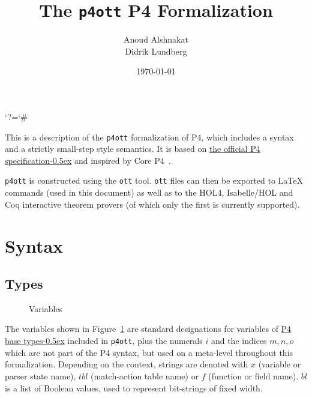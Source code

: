 \documentclass[UTF8]{article}
\title{%
The \texttt{p4ott} P4 Formalization}
\author{Anoud Alshnakat\\
Didrik Lundberg
}
\date{\today}
\begin{document}
\maketitle

\newcommand{\pfott}{\texttt{p4ott}}

\begingroup\lccode`?=`# \lowercase{\endgroup
\newcommand{\specsec}[1]{%
    ?#1%
}
}
\newcommand{\pfourspec}[2]{%
\href{https://p4lang.github.io/p4-spec/docs/P4-16-v1.2.2.html\specsec{#1}}{#2\kern-0.5ex} %
}

\noindent
This is a description of the \pfott{} formalization of P4, which includes a syntax and a strictly small-step style semantics. It is based on \pfourspec{}{the official P4 specification} and inspired by Core P4~\cite{doenges2021petr4}.

\pfott{} is constructed using the \texttt{ott} tool. \texttt{ott} files can then be exported to \LaTeX{} commands (used in this document) as well as to the HOL4, Isabelle/HOL and Coq interactive theorem provers (of which only the first is currently supported).

\section{Syntax}
\subsection{Types}
\newcommand{\num}{\ensuremath{i}}
\newcommand{\vn}{\ensuremath{x}}
\newcommand{\msg}{\ensuremath{\mathit{msg}}}
\newcommand{\tn}{\ensuremath{\mathit{tbl}}}
\newcommand{\fn}{\ensuremath{f}}
\newcommand{\inte}{\ensuremath{bl}}
%
%
\begin{figure}[h!]
\centering
\ottmetavars
\caption{Variables}
\label{fig:vars}
\end{figure}

The variables shown in Figure~\ref{fig:vars} are standard designations for variables of \pfourspec{sec-base-types}{P4 base types} included in \pfott{}, plus the numerals \num{} and the indices $m, n, o$ which are not part of the P4 syntax, but used on a meta-level throughout this formalization. Depending on the context, strings are denoted with \vn{} (variable or parser state name), \tn{} (match-action table name) or \fn{} (function or field name). \inte{} is a list of Boolean values, used to represent bit-strings of fixed width.
\end{document}
